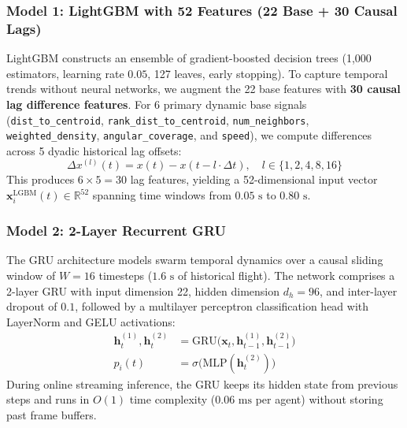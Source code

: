 \documentclass[9pt]{ieeeconf}
\newcommand{\RR}{\mathbb{R}}
\begin{document}
\subsubsection{Model 1: LightGBM with 52 Features (22 Base + 30 Causal Lags)}
LightGBM constructs an ensemble of gradient-boosted decision trees (1,000 estimators, learning rate $0.05$, 127 leaves, early stopping). To capture temporal trends without neural networks, we augment the 22 base features with \textbf{30 causal lag difference features}. For 6 primary dynamic base signals (\texttt{dist\_to\_centroid}, \texttt{rank\_dist\_to\_centroid}, \texttt{num\_neighbors}, \texttt{weighted\_density}, \texttt{angular\_coverage}, and \texttt{speed}), we compute differences across 5 dyadic historical lag offsets:
\begin{equation}
\Delta x^{(l)}(t) = x(t) - x(t - l \cdot \Delta t), \quad l \in \{1, 2, 4, 8, 16\}
\end{equation}
This produces $6 \times 5 = 30$ lag features, yielding a 52-dimensional input vector $\mathbf{x}_i^{\text{LGBM}}(t) \in \RR^{52}$ spanning time windows from $0.05\text{ s}$ to $0.80\text{ s}$.

\subsubsection{Model 2: 2-Layer Recurrent GRU}
The GRU architecture models swarm temporal dynamics over a causal sliding window of $W = 16$ timesteps ($1.6\text{ s}$ of historical flight). The network comprises a 2-layer GRU with input dimension 22, hidden dimension $d_h = 96$, and inter-layer dropout of $0.1$, followed by a multilayer perceptron classification head with LayerNorm and GELU activations:
\begin{align}
\mathbf{h}_t^{(1)}, \mathbf{h}_t^{(2)} &= \text{GRU}\big(\mathbf{x}_t, \mathbf{h}_{t-1}^{(1)}, \mathbf{h}_{t-1}^{(2)}\big) \\
p_i(t) &= \sigma\big(\text{MLP}(\mathbf{h}_t^{(2)})\big)
\end{align}
During online streaming inference, the GRU keeps its hidden state from previous steps and runs in $O(1)$ time complexity ($0.06\text{ ms}$ per agent) without storing past frame buffers.
\end{document}
